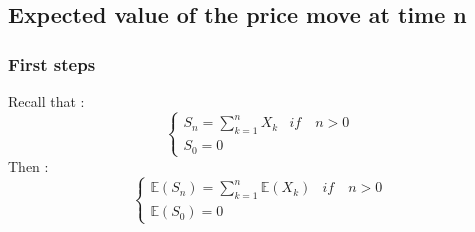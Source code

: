 \documentclass{article}
\begin{document}
\subsection{Expected value of the price move at time n}
\subsubsection{First steps}
Recall that :
\begin{equation*}
	\begin{cases}
        S_{n} = \sum_{k=1}^{n}X_{k} & if \quad n > 0 \\
        S_{0} = 0
     \end{cases}
\end{equation*}
Then :
\begin{equation*}
	\begin{cases}
        \mathbb{E}(S_{n}) = \sum_{k=1}^{n}\mathbb{E}(X_{k}) & if \quad n > 0 \\
        \mathbb{E}(S_{0}) = 0
     \end{cases}
\end{equation*}
\end{document}
